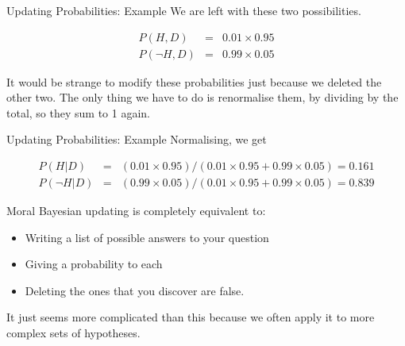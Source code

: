 \documentclass{beamer}
\begin{document}
\begin{frame}[t]{Updating Probabilities: Example}
We are left with these two possibilities.

\begin{eqnarray*}
P(H, D) &=& 0.01 \times 0.95\\
P(\neg H, D) &=& 0.99 \times 0.05
\end{eqnarray*}

It would be strange to modify these probabilities just because we deleted the
other two. The only thing we have to do is renormalise them, by dividing by the total, so they sum to 1 again.
\end{frame}

\begin{frame}[t]{Updating Probabilities: Example}
Normalising, we get

\begin{eqnarray*}
P(H | D) &=& (0.01 \times 0.95)/(0.01 \times 0.95 + 0.99\times0.05) = 0.161\\
P(\neg H | D) &=& (0.99 \times 0.05)/(0.01 \times 0.95 + 0.99\times0.05) = 0.839
\end{eqnarray*}
\end{frame}

\begin{frame}[t]{Moral}
Bayesian updating is completely equivalent to:
\begin{itemize}
\item Writing a list of possible answers to your question
\item Giving a probability to each
\item Deleting the ones that you discover are false.
\end{itemize}

It just seems more complicated than this because we often apply it to more
complex sets of hypotheses.
\end{frame}
\end{document}
